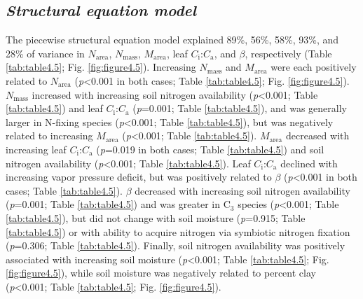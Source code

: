 \subsection{\textit{Structural equation model}}
\noindent The piecewise structural equation model explained 89\%, 56\%, 58\%, 93\%, and 28\% of variance in $N_\mathrm{area}$, $N_\mathrm{mass}$, $M_\mathrm{area}$, leaf $C_\mathrm{i}$:$C_\mathrm{a}$, and $\beta$, respectively (Table \ref{tab:table4.5}; Fig. \ref{fig:figure4.5}). Increasing $N_\mathrm{mass}$ and $M_\mathrm{area}$ were each positively related to $N_\mathrm{area}$ (\textit{p}<0.001 in both cases; Table \ref{tab:table4.5}; Fig. \ref{fig:figure4.5}). $N_\mathrm{mass}$ increased with increasing soil nitrogen availability (\textit{p}<0.001; Table \ref{tab:table4.5}) and leaf $C_\mathrm{i}$:$C_\mathrm{a}$ (\textit{p}=0.001; Table \ref{tab:table4.5}), and was generally larger in N-fixing species (\textit{p}<0.001; Table \ref{tab:table4.5}), but was negatively related to increasing $M_\mathrm{area}$ (\textit{p}<0.001; Table \ref{tab:table4.5}). $M_\mathrm{area}$ decreased with increasing leaf $C_\mathrm{i}$:$C_\mathrm{a}$ (\textit{p}=0.019 in both cases; Table \ref{tab:table4.5}) and soil nitrogen availability (\textit{p}<0.001; Table \ref{tab:table4.5}). Leaf $C_\mathrm{i}$:$C_\mathrm{a}$ declined with increasing vapor pressure deficit, but was positively related to $\beta$ (\textit{p}<0.001 in both cases; Table \ref{tab:table4.5}). $\beta$ decreased with increasing soil nitrogen availability (\textit{p}=0.001; Table \ref{tab:table4.5}) and was greater in C$_3$ species (\textit{p}<0.001; Table \ref{tab:table4.5}), but did not change with soil moisture (\textit{p}=0.915; Table \ref{tab:table4.5}) or with ability to acquire nitrogen via symbiotic nitrogen fixation (\textit{p}=0.306; Table \ref{tab:table4.5}). Finally, soil nitrogen availability was positively associated with increasing soil moisture (\textit{p}<0.001; Table \ref{tab:table4.5}; Fig. \ref{fig:figure4.5}), while soil moisture was negatively related to percent clay (\textit{p}<0.001; Table \ref{tab:table4.5}; Fig. \ref{fig:figure4.5}).

